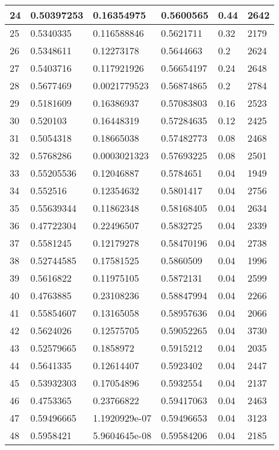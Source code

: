 \begin{longtable}{|l|l|l|l|l|l|}
24 & 0.50397253 & 0.16354975 & 0.5600565 & 0.44 & 2642 \\ \hline 
25 & 0.5340335 & 0.116588846 & 0.5621711 & 0.32 & 2179 \\ \hline 
26 & 0.5348611 & 0.12273178 & 0.5644663 & 0.2 & 2624 \\ \hline 
27 & 0.5403716 & 0.117921926 & 0.56654197 & 0.24 & 2648 \\ \hline 
28 & 0.5677469 & 0.0021779523 & 0.56874865 & 0.2 & 2784 \\ \hline 
29 & 0.5181609 & 0.16386937 & 0.57083803 & 0.16 & 2523 \\ \hline 
30 & 0.520103 & 0.16448319 & 0.57284635 & 0.12 & 2425 \\ \hline 
31 & 0.5054318 & 0.18665038 & 0.57482773 & 0.08 & 2468 \\ \hline 
32 & 0.5768286 & 0.0003021323 & 0.57693225 & 0.08 & 2501 \\ \hline 
33 & 0.55205536 & 0.12046887 & 0.5784651 & 0.04 & 1949 \\ \hline 
34 & 0.552516 & 0.12354632 & 0.5801417 & 0.04 & 2756 \\ \hline 
35 & 0.55639344 & 0.11862348 & 0.58168405 & 0.04 & 2634 \\ \hline 
36 & 0.47722304 & 0.22496507 & 0.5832725 & 0.04 & 2339 \\ \hline 
37 & 0.5581245 & 0.12179278 & 0.58470196 & 0.04 & 2738 \\ \hline 
38 & 0.52744585 & 0.17581525 & 0.5860509 & 0.04 & 1996 \\ \hline 
39 & 0.5616822 & 0.11975105 & 0.5872131 & 0.04 & 2599 \\ \hline 
40 & 0.4763885 & 0.23108236 & 0.58847994 & 0.04 & 2266 \\ \hline 
41 & 0.55854607 & 0.13165058 & 0.58957636 & 0.04 & 2066 \\ \hline 
42 & 0.5624026 & 0.12575705 & 0.59052265 & 0.04 & 3730 \\ \hline 
43 & 0.52579665 & 0.1858972 & 0.5915212 & 0.04 & 2035 \\ \hline 
44 & 0.5641335 & 0.12614407 & 0.5923402 & 0.04 & 2447 \\ \hline 
45 & 0.53932303 & 0.17054896 & 0.5932554 & 0.04 & 2137 \\ \hline 
46 & 0.4753365 & 0.23766822 & 0.59417063 & 0.04 & 2463 \\ \hline 
47 & 0.59496665 & 1.1920929e-07 & 0.59496653 & 0.04 & 3123 \\ \hline 
48 & 0.5958421 & 5.9604645e-08 & 0.59584206 & 0.04 & 2185 \\ \hline 

\end{longtable}
